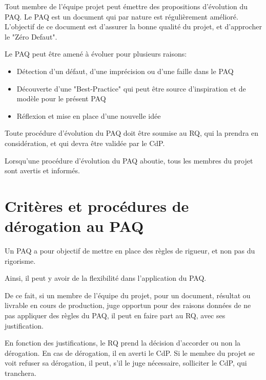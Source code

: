 \documentclass[a4paper, 18pt]{article}
\begin{document}
Tout membre de l'équipe projet peut émettre des propositions d'évolution du PAQ. Le PAQ est un document qui par nature est régulièrement amélioré. L'objectif de ce document est d'assurer la bonne qualité du projet, et d'approcher le "Zéro Defaut".

Le PAQ peut être amené à évoluer pour plusieurs raisons:

\begin{itemize}
\item Détection d'un défaut, d'une imprécision ou d'une faille dans le PAQ
\item Découverte d'une "Best-Practice" qui peut être source d'inspiration et de modèle pour le présent PAQ
\item Réflexion et mise en place d'une nouvelle idée
\end{itemize}

Toute procédure d'évolution du PAQ doit être soumise au RQ, qui la prendra en considération, et qui devra être validée par le CdP.

Lorsqu'une procédure d'évolution du PAQ aboutie, tous les membres du projet sont avertis et informés.

\section{Critères et procédures de dérogation au PAQ}

Un PAQ a pour objectif de mettre en place des règles de rigueur, et non pas du rigorisme.

Ainsi, il peut y avoir de la flexibilité dans l'application du PAQ.

De ce fait, si un membre de l'équipe du projet, pour un document, résultat ou livrable en cours de production, juge opportun pour des raisons données de ne pas appliquer des règles du PAQ, il peut en faire part au RQ, avec ses justification.

En fonction des justifications, le RQ prend la décision d'accorder ou non la dérogation. En cas de dérogation, il en averti le CdP. Si le membre du projet se voit refuser sa dérogation, il peut, s'il le juge nécessaire, solliciter le CdP, qui tranchera.
\end{document}
